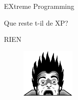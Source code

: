 \begin{frame}{EXtreme Programming}
  \begin{alertblock}{Que reste t-il de XP?}
    \begin{center}
      RIEN
      \begin{figure}
        \includegraphics[scale=0.7]{img/coding_horror.png}
      \end{figure}
    \end{center}
    \end{alertblock}
\end{frame}


